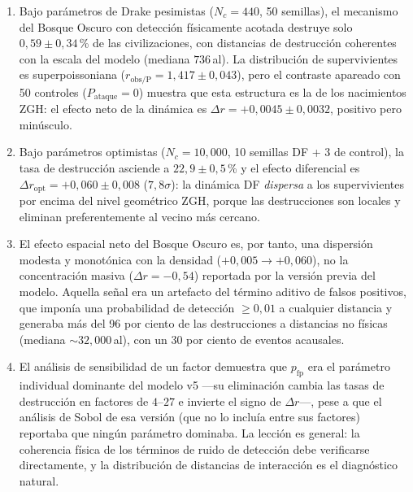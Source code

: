 \documentclass[useAMS,usenatbib,onecolumn]{mn2e}
\begin{document}
\begin{enumerate}
  \item Bajo parámetros de Drake pesimistas ($N_c = 440$, 50 semillas),
        el mecanismo del Bosque Oscuro con detección físicamente
        acotada destruye solo $0{,}59 \pm 0{,}34$\,\% de las
        civilizaciones, con distancias de destrucción coherentes con la
        escala del modelo (mediana $736$\,al).
        La distribución de supervivientes es superpoissoniana
        ($r_\text{obs/P} = 1{,}417 \pm 0{,}043$), pero el contraste
        apareado con 50 controles ($P_\text{ataque} = 0$) muestra que
        esta estructura es la de los nacimientos ZGH: el efecto neto de
        la dinámica es $\Delta r = +0{,}0045 \pm 0{,}0032$, positivo
        pero minúsculo.

  \item Bajo parámetros optimistas ($N_c = 10{,}000$, 10 semillas DF +
        3 de control), la tasa de destrucción asciende a
        $22{,}9 \pm 0{,}5$\,\% y el efecto diferencial es
        $\Delta r_\text{opt} = +0{,}060 \pm 0{,}008$ ($7{,}8\sigma$):
        la dinámica DF \emph{dispersa} a los supervivientes por encima
        del nivel geométrico ZGH, porque las destrucciones son locales
        y eliminan preferentemente al vecino más cercano.

  \item El efecto espacial neto del Bosque Oscuro es, por tanto, una
        dispersión modesta y monotónica con la densidad
        ($+0{,}005 \to +0{,}060$), no la concentración masiva
        ($\Delta r = -0{,}54$) reportada por la versión previa del
        modelo.
        Aquella señal era un artefacto del término aditivo de falsos
        positivos, que imponía una probabilidad de detección
        $\geq 0{,}01$ a cualquier distancia y generaba más del 96 por
        ciento de las destrucciones a distancias no físicas
        (mediana $\sim 32{,}000$\,al), con un 30 por ciento de eventos
        acausales.

  \item El análisis de sensibilidad de un factor demuestra que
        $p_\text{fp}$ era el parámetro individual dominante del modelo
        v5 —su eliminación cambia las tasas de destrucción en factores
        de $4$--$27$ e invierte el signo de $\Delta r$—, pese a que el
        análisis de Sobol de esa versión (que no lo incluía entre sus
        factores) reportaba que ningún parámetro dominaba.
        La lección es general: la coherencia física de los términos de
        ruido de detección debe verificarse directamente, y la
        distribución de distancias de interacción es el diagnóstico
        natural.


\end{enumerate}
\end{document}
